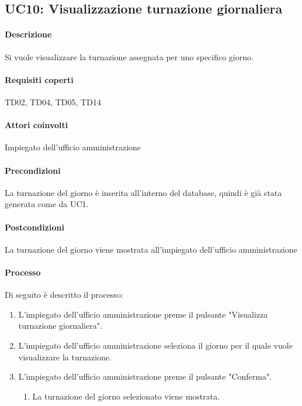 \subsection{UC10: Visualizzazione turnazione giornaliera}
\paragraph{Descrizione}
Si vuole visualizzare la turnazione assegnata per uno specifico giorno.
\paragraph{Requisiti coperti}
TD02, TD04, TD05, TD14
\paragraph{Attori coinvolti}
Impiegato dell'ufficio amministrazione
\paragraph{Precondizioni}
La turnazione del giorno è inserita all'interno del database, quindi è già stata generata come da UC1.
\paragraph{Postcondizioni}
La turnazione del giorno viene mostrata all'impiegato dell'ufficio amministrazione
\paragraph{Processo}
Di seguito è descritto il processo:
\begin{enumerate}
	\item L'impiegato dell'ufficio amministrazione preme il pulsante "Visualizza turnazione giornaliera".
	\item L'impiegato dell'ufficio amministrazione seleziona il giorno per il quale vuole visualizzare la turnazione.
	\item L'impiegato dell'ufficio amministrazione preme il pulsante "Conferma".
		\begin{enumerate}
			\item La turnazione del giorno selezionato viene mostrata.
		\end{enumerate}
\end{enumerate}
